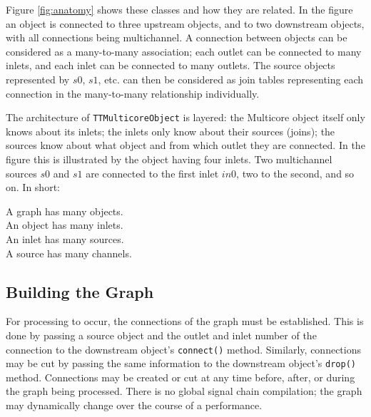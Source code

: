 \documentclass[twoside,a4paper]{article}
\begin{document}
Figure \ref{fig:anatomy} shows these classes and how they are related. 
In the figure an object is connected to three upstream objects, and to two downstream objects, with all connections being multichannel. 
A connection between objects can be considered as a many-to-many association; each outlet can be connected to many inlets, and each inlet can be connected to many outlets. 
The source objects represented by $s0$, $s1$, etc. can then be considered as join tables representing each connection in the many-to-many relationship individually.

The architecture of \texttt{TTMulticoreObject} is layered: the Multicore object itself only knows about its inlets; the inlets only know about their sources (joins); the sources know about what object and from which outlet they are connected. 
In the figure this is illustrated by the object having four inlets. 
Two multichannel sources $s0$ and $s1$ are connected to the first inlet $in0$, two to the second, and so on. 
In short:

				A graph has many objects.\\
\indent	An object has many inlets.\\
\indent	An inlet has many sources.\\
\indent	A source has many channels.\\




\subsection{Building the Graph} %

For processing to occur, the connections of the graph must be established.  
This is done by passing a source object and the outlet and inlet number of the connection to the downstream object's \texttt{connect()} method.  
Similarly, connections may be cut by passing the same information to the downstream object's \texttt{drop()} method.  
Connections may be created or cut at any time before, after, or during the graph being processed.  
There is no global signal chain compilation; the graph may dynamically change over the course of a performance.
\end{document}
